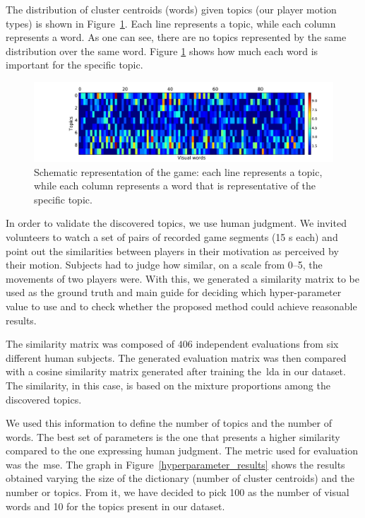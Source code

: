 The distribution of cluster centroids (words) given topics (our player motion types) is shown in Figure~\ref{fig:overall_game}.
Each line represents a topic, while each column represents a word. As one can see, there are no topics represented by the same distribution over the same word. Figure \ref{fig:overall_game} shows how much each word is important for the specific topic.

\begin{figure}[h]
	\centering
	\includegraphics[width=\textwidth]{images/05-modeling/lda_heatmap}
	\caption{Schematic representation of the game: each line represents a topic, while each column represents a word that is representative of the specific topic.}
  \label{fig:overall_game}
\end{figure}

In order to validate the discovered topics, we use human judgment. We invited volunteers to watch a set of pairs of recorded game segments (15 s each) and point out the similarities between players in their motivation as perceived by their motion. Subjects had to judge how similar, on a scale from 0--5, the movements of two players were. With this, we generated a similarity matrix to be used as the ground truth and main guide for deciding which hyper-parameter value to use and to check whether the proposed method could achieve reasonable results.

The similarity matrix was composed of $406$ independent evaluations from six different human subjects. The generated evaluation matrix was then compared with a cosine similarity matrix generated after training the~\gls{lda} in our dataset. The similarity, in this case, is based on the mixture proportions among the discovered topics. 

We used this information to define the number of topics and the number of words. The best set of parameters is the one that presents a higher similarity compared to the one expressing human judgment. The metric used for evaluation was the~\gls{mse}. The graph in Figure~\ref{hyperparameter_results} shows the results obtained varying the size of the dictionary (number of cluster centroids) and the number or topics. From it, we have decided to pick 100 as the number of visual words and 10 for the topics present in our dataset.

